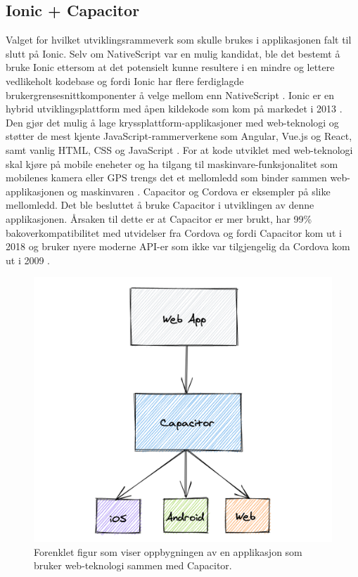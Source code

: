 \subsection{Ionic + Capacitor}
Valget for hvilket utviklingsrammeverk som skulle brukes i applikasjonen falt til slutt på Ionic. Selv om NativeScript var en mulig kandidat, ble det bestemt å bruke Ionic ettersom at det potensielt kunne resultere i en mindre og lettere vedlikeholt kodebase og fordi Ionic har flere ferdiglagde brukergrensesnittkomponenter å velge mellom enn NativeScript \cite{FrameWorkComparison}. Ionic er en hybrid utviklingsplattform med åpen kildekode som kom på markedet i 2013 \cite{IntroducingIonicIonic}. Den gjør det mulig å lage kryssplattform-applikasjoner med web-teknologi og støtter de mest kjente JavaScript-rammerverkene som Angular, Vue.js og React, samt vanlig HTML, CSS og JavaScript \cite{IonicCrossPlatformMobile}. For at kode utviklet med web-teknologi skal kjøre på mobile eneheter og ha tilgang til maskinvare-funksjonalitet som mobilenes kamera eller GPS trengs det et mellomledd som binder sammen web-applikasjonen og maskinvaren \cite{CapacitorBlogHow}. Capacitor \cite{CapacitorCrossplatformNative} og Cordova \cite{ApacheCordova} er eksempler på slike mellomledd. Det ble besluttet å bruke Capacitor i utviklingen av denne applikasjonen. Årsaken til dette er at Capacitor er mer brukt, har 99\% bakoverkompatibilitet med utvidelser fra Cordova og fordi Capacitor kom ut i 2018 og bruker nyere moderne API-er som ikke var tilgjengelig da Cordova kom ut i 2009 \cite{CordovaVsCapacitor}. 

\begin{figure}[H]
\centering
\captionsetup{width=.8\linewidth}
\includegraphics[scale=0.5]{Figurer/Bilder/capacitor-figure.png}
\caption{Forenklet figur som viser oppbygningen av en applikasjon som bruker web-teknologi sammen med Capacitor.}
\label{fig:how-capacitor-works}
\end{figure}

